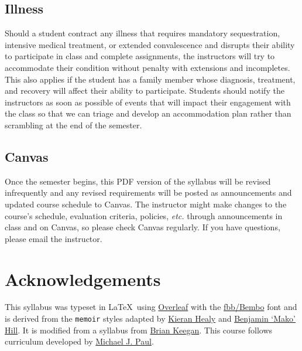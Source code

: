 \documentclass[10pt]{memoir}
\begin{document}
\subsection{Illness}
Should a student contract any illness that requires mandatory sequestration, intensive medical treatment, or extended convalescence and disrupts their ability to participate in class and complete assignments, the instructors will try to accommodate their condition without penalty with extensions and incompletes. This also applies if the student has a family member whose diagnosis, treatment, and recovery will affect their ability to participate. Students should notify the instructors as soon as possible of events that will impact their engagement with the class so that we can triage and develop an accommodation plan rather than scrambling at the end of the semester.

\subsection{Canvas}
Once the semester begins, this PDF version of the syllabus will be revised infrequently and any revised requirements will be posted as announcements and updated course schedule to Canvas. The instructor might make changes to the course's schedule, evaluation criteria, policies, \textit{etc.} through announcements in class and on Canvas, so please check Canvas regularly. If you have questions, please email the instructor.

\section{\textbf{Acknowledgements}}

This syllabus was typeset in \LaTeX~using \href{http://www.sharelatex.com}{Overleaf} with the \href{http://www.tug.dk/FontCatalogue/fbb/}{fbb/Bembo} font and is derived from the \texttt{memoir} styles adapted by \href{https://github.com/kjhealy/latex-custom-kjh}{Kieran Healy} and \href{http://projects.mako.cc/source/?p=latex_mako;a=summary}{Benjamin `Mako' Hill}. It is modified from a syllabus from \href{https://www.brianckeegan.com/}{Brian Keegan}. This course follows curriculum developed by \href{https://cmci.colorado.edu/~mpaul/}{Michael J. Paul}.



\renewcommand{\bibsection}{\section{\huge \bibname}\prebibhook}
\baselineskip 14.2pt

\end{document}
